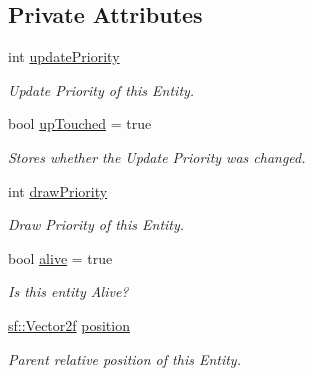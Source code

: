 \subsection*{Private Attributes}
\begin{DoxyCompactItemize}
\item 
\mbox{\label{class_game_entity_ac3312f11d19d61aebd436504342a1ad2}} 
int \mbox{\hyperlink{class_game_entity_ac3312f11d19d61aebd436504342a1ad2}{update\+Priority}}
\begin{DoxyCompactList}\small\item\em Update Priority of this Entity. \end{DoxyCompactList}\item 
\mbox{\label{class_game_entity_aad165d941eb1cca033b527ac79eb6008}} 
bool \mbox{\hyperlink{class_game_entity_aad165d941eb1cca033b527ac79eb6008}{up\+Touched}} = true
\begin{DoxyCompactList}\small\item\em Stores whether the Update Priority was changed. \end{DoxyCompactList}\item 
\mbox{\label{class_game_entity_ae2a8b4cce2f78d948a587c7e720bf769}} 
int \mbox{\hyperlink{class_game_entity_ae2a8b4cce2f78d948a587c7e720bf769}{draw\+Priority}}
\begin{DoxyCompactList}\small\item\em Draw Priority of this Entity. \end{DoxyCompactList}\item 
\mbox{\label{class_game_entity_ad9bcbcfcc3f66bc361b8ab0c643b2f13}} 
bool \mbox{\hyperlink{class_game_entity_ad9bcbcfcc3f66bc361b8ab0c643b2f13}{alive}} = true
\begin{DoxyCompactList}\small\item\em Is this entity Alive? \end{DoxyCompactList}\item 
\mbox{\label{class_game_entity_aed293041960e17b6b1233c1db6ac1dad}} 
\mbox{\hyperlink{classsf_1_1_vector2}{sf\+::\+Vector2f}} \mbox{\hyperlink{class_game_entity_aed293041960e17b6b1233c1db6ac1dad}{position}}
\begin{DoxyCompactList}\small\item\em Parent relative position of this Entity. \end{DoxyCompactList}\item 

\end{DoxyCompactItemize}
